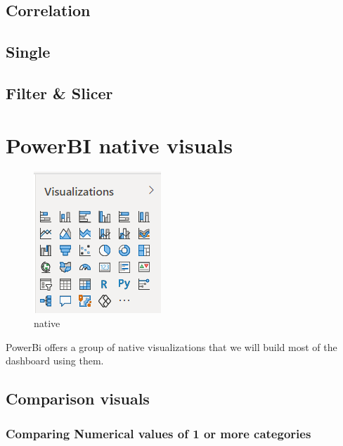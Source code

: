 \documentclass[
]{book}
\begin{document}
\hypertarget{correlation}{%
\section{Correlation}\label{correlation}}

\hypertarget{single}{%
\section{Single}\label{single}}

\hypertarget{filter-slicer}{%
\section{Filter \& Slicer}\label{filter-slicer}}

\hypertarget{powerbi-native-visuals}{%
\chapter{PowerBI native visuals}\label{powerbi-native-visuals}}

\begin{figure}
\centering
\includegraphics{assets/native1.png}
\caption{native}
\end{figure}

PowerBi offers a group of native visualizations that we will build most of the dashboard using them.

\hypertarget{comparison-visuals}{%
\section{Comparison visuals}\label{comparison-visuals}}

\hypertarget{comparing-numerical-values-of-1-or-more-categories}{%
\subsection{Comparing Numerical values of 1 or more categories}\label{comparing-numerical-values-of-1-or-more-categories}}
\end{document}
